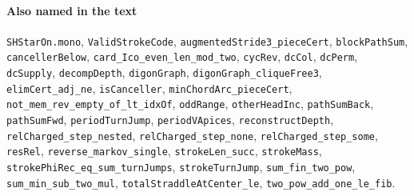 \paragraph{Also named in the text}
{\small\raggedright \texttt{SHStarOn.mono}, \texttt{ValidStrokeCode}, \texttt{augmentedStride3\_pieceCert}, \texttt{blockPathSum}, \texttt{cancellerBelow}, \texttt{card\_Ico\_even\_len\_mod\_two}, \texttt{cycRev}, \texttt{dcCol}, \texttt{dcPerm}, \texttt{dcSupply}, \texttt{decompDepth}, \texttt{digonGraph}, \texttt{digonGraph\_cliqueFree3}, \texttt{elimCert\_adj\_ne}, \texttt{isCanceller}, \texttt{minChordArc\_pieceCert}, \texttt{not\_mem\_rev\_empty\_of\_lt\_idxOf}, \texttt{oddRange}, \texttt{otherHeadInc}, \texttt{pathSumBack}, \texttt{pathSumFwd}, \texttt{periodTurnJump}, \texttt{periodVApices}, \texttt{reconstructDepth}, \texttt{relCharged\_step\_nested}, \texttt{relCharged\_step\_none}, \texttt{relCharged\_step\_some}, \texttt{resRel}, \texttt{reverse\_markov\_single}, \texttt{strokeLen\_succ}, \texttt{strokeMass}, \texttt{strokePhiRec\_eq\_sum\_turnJumps}, \texttt{strokeTurnJump}, \texttt{sum\_fin\_two\_pow}, \texttt{sum\_min\_sub\_two\_mul}, \texttt{totalStraddleAtCenter\_le}, \texttt{two\_pow\_add\_one\_le\_fib}.\par}
